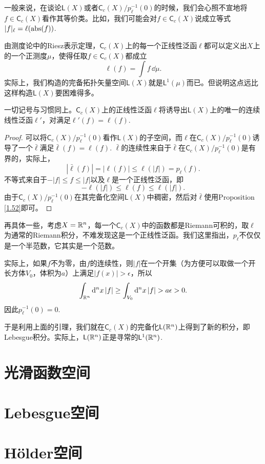 一般来说，在谈论$\mathsf{L}(X)$或者$\mathsf{C}_c(X)/p_\ell^{-1}(0)$的时候，我们会心照不宣地将$f\in \mathsf{C}_c(X)$看作其等价类。比如，我们可能会对$f\in \mathsf{C}_c(X)$说成立等式$|f|_\ell = \ell(\operatorname{abs}(f))$.

由测度论中的Riesz表示定理，$\mathsf{C}_c(X)$上的每一个正线性泛函$\ell$都可以定义出$X$上的一个正测度$\mu$，使得任取$f\in \mathsf{C}_c(X)$都成立
\[
	\ell(f)=\int f\,\dd \mu.
\]
实际上，我们构造的完备拓扑矢量空间$\mathsf{L}(X)$就是$\mathsf{L}^1(\mu)$而已。但说明这点远比这样构造$\mathsf{L}(X)$要困难得多。

\begin{lem}
	一切记号与习惯同上。$\mathsf{C}_c(X)$上的正线性泛函$\ell$将诱导出$\mathsf{L}(X)$上的唯一的连续线性泛函$\ell'$，对满足$\ell'(f)=\ell(f)$.
\end{lem}

\begin{proof}
	可以将$\mathsf{C}_c(X)/p_\ell^{-1}(0)$看作$\mathsf{L}(X)$的子空间，而$\ell$在$\mathsf{C}_c(X)/p_\ell^{-1}(0)$诱导了一个$\bar{\ell}$满足$\bar{\ell}(f)=\ell(f)$. $\bar{\ell}$的连续性来自于$\bar{\ell}$在$\mathsf{C}_c(X)/p_\ell^{-1}(0)$是有界的，实际上，
	\[
	|\bar{\ell}(f)|=|\ell(f)|\leq \ell(|f|)=p_\ell(f).
	\]
	不等式来自于$-|f|\leq f\leq |f|$以及$\ell$是一个正线性泛函，即
	\[
	-\ell(|f|)\leq \ell(f)\leq \ell(|f|).
	\]
	由于$\mathsf{C}_c(X)/p_\ell^{-1}(0)$在其完备化空间$\mathsf{L}(X)$中稠密，然后对$\bar{\ell}$使用Proposition \ref{1.52}即可。
\end{proof}

再具体一些，考虑$X=\mathbb{R}^n$，每一个$\mathsf{C}_c(X)$中的函数都是Riemann可积的，取$\ell$为通常的Riemann积分，不难发现这是一个正线性泛函。我们这里指出，$p_\ell$不仅仅是一个半范数，它其实是一个范数。

实际上，如果$f$不为零，由$f$的连续性，则$|f|$在一个开集（为方便可以取做一个开长方体$V_0$，体积为$a$）上满足$|f(x)|>\epsilon$，所以
\[
	\int_{\rr^n}\dd^n x\, |f|\geq \int_{V_0}\dd^n x\, |f|>a\epsilon>0.
\]
因此$p_\ell^{-1}(0)=0$.

于是利用上面的引理，我们就在$\mathsf{C}_c(X)$的完备化$\mathsf{L}(\mathbb{R}^n)$上得到了新的积分，即Lebesgue积分。实际上，$\mathsf{L}(\mathbb{R}^n)$正是寻常的$\mathsf{L}^1(\mathbb{R}^n)$.

\section{光滑函数空间}

\section{Lebesgue空间}

\section{H\"{o}lder空间}